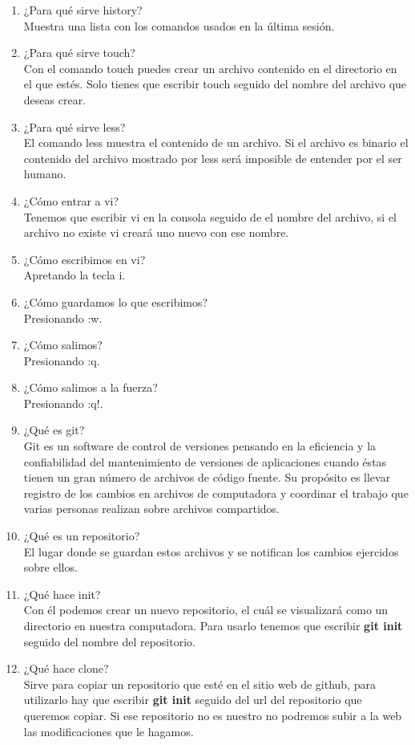 \documentclass[letterpaper, 12pt, oneside]{article}%
\begin{document}
\begin{enumerate}
		\item ¿Para qué sirve history? \\ Muestra una lista con los comandos usados en la última sesión.
		\item ¿Para qué sirve touch? \\ Con el comando touch puedes crear un archivo contenido en el directorio en el que estés. Solo tienes que escribir touch seguido del nombre del archivo que deseas crear.
		\item ¿Para qué sirve less? \\ El comando less muestra el contenido de un archivo. Si el archivo es binario el contenido del archivo mostrado por less será imposible de entender por el ser humano.
		\item ¿Cómo entrar a vi? \\ Tenemos que escribir vi en la consola seguido de el nombre del archivo, si el archivo no existe vi creará uno nuevo con ese nombre.
		\item ¿Cómo escribimos en vi? \\ Apretando la tecla i.
		\item ¿Cómo guardamos lo que escribimos? \\ Presionando :w.
		\item ¿Cómo salimos? \\ Presionando :q.
		\item ¿Cómo salimos a la fuerza? \\ Presionando :q!.
		\item ¿Qué es git? \\ Git es un software de control de versiones pensando en la eficiencia y la confiabilidad del mantenimiento de versiones de aplicaciones cuando éstas tienen un gran número de archivos de código fuente. Su propósito es llevar registro de los cambios en archivos de computadora y coordinar el trabajo que varias personas realizan sobre archivos compartidos.
		\item ¿Qué es un repositorio? \\ El lugar donde se guardan estos archivos y se notifican los cambios ejercidos sobre ellos.
		\item ¿Qué hace init? \\ Con él podemos crear un nuevo repositorio, el cuál se visualizará como un directorio en nuestra computadora. Para usarlo tenemos que escribir \textbf{git init} seguido del nombre del repositorio.
		\item ¿Qué hace clone? \\ Sirve para copiar un repositorio que esté en el sitio web de github, para utilizarlo hay que escribir \textbf{git init} seguido del url del repositorio que queremos copiar. Si ese repositorio no es nuestro no podremos subir a la web las modificaciones que le hagamos.

\end{enumerate}
\end{document}
